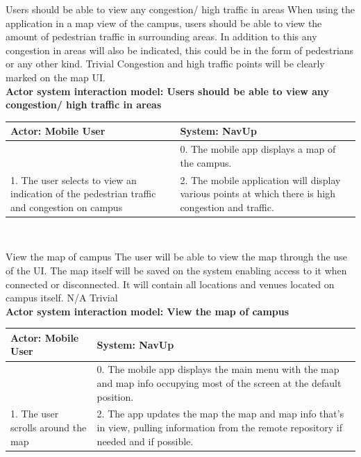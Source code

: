 \FuncReq
{Users should be able to view any congestion/ high traffic in areas}
{When using the application in a map view of the campus, users should be able to view the amount of pedestrian traffic in surrounding areas. In addition to this any congestion in areas will also be indicated, this could be in the form of pedestrians or any other kind.}
{Trivial}
{Congestion and high traffic points will be clearly marked on the map UI.}
\bigskip
	\\
    \textbf{Actor system interaction model: Users should be able to view any congestion/ high traffic in areas}\\
    \begin{tabular}{ | p{6cm} | p{6cm} |}
    \hline
    Actor: Mobile User & System: NavUp \\ \hline
    & 0. The mobile app displays a map of the campus.\\ \hline
    1. The user selects to view an indication of the pedestrian traffic and congestion on campus & 2. The mobile application will display various points at which there is high congestion and traffic.\\ \hline
    \end{tabular}
\\
\bigskip

\FuncReq
{View the map of campus}
{The user will be able to view the map through the use of the UI. The map itself will be saved on the system enabling access to it when connected or disconnected. It will contain all locations and venues located on campus itself.}
{N/A}
{Trivial}
    \\
    \textbf{Actor system interaction model: View the map of campus }\\
    \begin{tabular}{ | p{6cm} | p{6cm} |}
    \hline
    Actor: Mobile User & System: NavUp \\ \hline
     & 0. The mobile app displays the main menu with the map and map info occupying most of the screen at the default position.\\ \hline
    1. The user scrolls around the map & 2. The app updates the map the map and map info that's in view, pulling information from the remote repository if needed and if possible.\\ \hline
    
    \end{tabular}
\\
\bigskip

